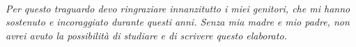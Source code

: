 ~\\
~\\
~\\
~\\
~\\
~\\
~\\
~\\
~\\
~\\
~\\
~\\
~\\
~\\
~\\
~\\
~\\
~\\
~\\
~\\
~\\
~\\
~\\
~\\
~\\
~\\
~\\
~\\
~\\
~\\
~\\
~\\
~\\
\begin{flushright}
\emph{Per questo traguardo devo ringraziare innanzitutto i miei genitori, che mi hanno sostenuto e incoraggiato durante questi anni. Senza mia madre e mio padre, non avrei avuto la possibilità di studiare e di scrivere questo elaborato.}
\end{flushright}